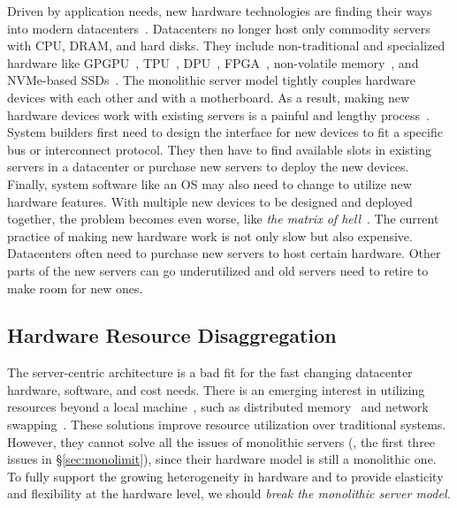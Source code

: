 \documentclass[10pt,times,twocolumn]{z2-article}
\begin{document}
Driven by application needs, new hardware technologies are finding their ways into modern datacenters~\cite{sigarch-dc}.
Datacenters no longer host only commodity servers with CPU, DRAM, and hard disks. 
They include non-traditional and specialized hardware like GPGPU~\cite{GPU-google,GPU-aws}, 
TPU~\cite{TPU}, 
DPU~\cite{DPU},
FPGA~\cite{Putnam14-FPGA,Amazon-F1}, %
non-volatile memory~\cite{Intel3DXpoint}, %
and NVMe-based SSDs~\cite{everspin}.
%
The monolithic server model tightly couples hardware devices with each other and with a motherboard.
As a result, making new hardware devices work with existing servers is a painful and lengthy process~\cite{Putnam14-FPGA}.
System builders first need to design the interface for new devices to fit a specific bus or interconnect protocol.
They then have to find available slots in existing servers in a datacenter 
or purchase new servers to deploy the new devices.
Finally, system software like an OS may also need to change to utilize new hardware features.
With multiple new devices to be designed and deployed together, 
the problem becomes even worse, like {\em the matrix of hell}~\cite{Docker-PAAS}.
\fi
%
The current practice of making new hardware work is not only slow but also expensive.
Datacenters often need to purchase new servers to host certain hardware.
Other parts of the new servers can go underutilized 
and old servers need to retire to make room for new ones.


\subsection{Hardware Resource Disaggregation}
The server-centric architecture is a bad fit for the fast changing datacenter hardware, software, and cost needs.
There is an emerging interest in utilizing resources beyond a local machine~\cite{Gao16-OSDI},
such as distributed memory~\cite{Dragojevic14-FaRM,Nelson15-ATC,Aguilera17-SOCC,Novakovic16-SOCC} and network swapping~\cite{GU17-NSDI}. 
These solutions improve resource utilization over traditional systems.
However, they cannot solve all the issues of monolithic servers (\eg, the first three issues in \S\ref{sec:monolimit}), 
since their hardware model is still a monolithic one.
To fully support the growing heterogeneity in hardware and to provide elasticity and flexibility at the hardware level, 
we should {\em break the monolithic server model.}%
\end{document}
